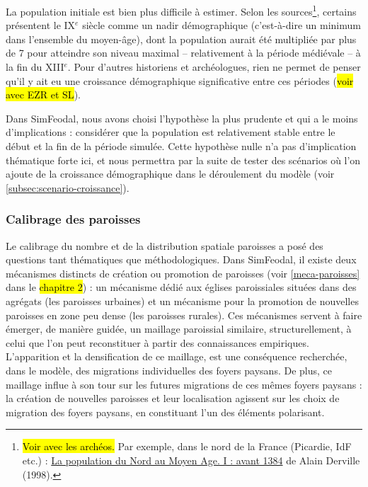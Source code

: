 La population initiale est bien plus difficile à estimer.
Selon les sources\footnote{
	\hl{Voir avec les archéos.}
	Par exemple, dans le nord de la France (Picardie, IdF etc.) :  \og \href{https://www.persee.fr/doc/rnord_0035-2624_1998_num_80_326_2872}{La population du Nord au Moyen Age. I : avant 1384}\fg{} de Alain Derville (1998).
}, certains présentent le IX$^e$ siècle comme un \og nadir\fg{} démographique (c'est-à-dire un minimum dans l'ensemble du moyen-âge), dont la population aurait été multipliée par plus de 7 pour atteindre son niveau maximal -- relativement à la période médiévale -- à la fin du XIII$^e$.
Pour d'autres historiens et archéologues, rien ne permet de penser qu'il y ait eu une croissance démographique significative entre ces périodes (\hl{voir avec EZR et SL}).

Dans SimFeodal, nous avons choisi l'hypothèse la plus prudente et qui a le moins d'implications : considérer que la population est relativement stable entre le début et la fin de la période simulée.
Cette \og hypothèse nulle\fg{} n'a pas d'implication thématique forte ici, et nous permettra par la suite de tester des scénarios où l'on ajoute de la croissance démographique dans le déroulement du modèle (voir \cref{subsec:scenario-croissance}).


\subsubsection{Calibrage des paroisses}

Le calibrage du nombre et de la distribution spatiale paroisses a posé des questions tant thématiques que méthodologiques.
Dans SimFeodal, il existe deux mécanismes distincts de création ou promotion de paroisses (voir \cref{meca-paroisses} dans le \hl{chapitre 2}) : un mécanisme dédié aux églises paroissiales situées dans des agrégats (les paroisses \og urbaines\fg{}) et un mécanisme pour la promotion de nouvelles paroisses en zone peu dense (les paroisses \og rurales\fg{}).
Ces mécanismes servent à faire émerger, de manière guidée, un maillage paroissial similaire, structurellement, à celui que l'on peut reconstituer à partir des connaissances empiriques.
L'apparition et la densification de ce maillage, est une conséquence recherchée, dans le modèle, des migrations individuelles des foyers paysans.
De plus, ce maillage influe à son tour sur les futures migrations de ces mêmes foyers paysans : la création de nouvelles paroisses et leur localisation agissent sur les choix de migration des foyers paysans, en constituant l'un des éléments polarisant.

